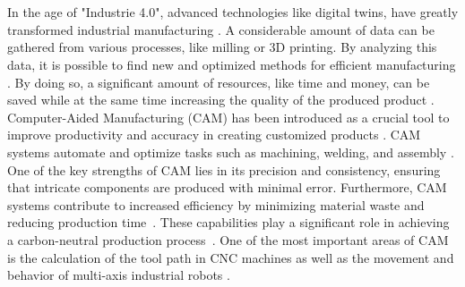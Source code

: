 \documentclass[ZLstudentexpose%
              ,optBiber%
              ,optEnglish%
              ,10pt
              ]{ZLlatex}%
\begin{document}
%
\renewcommand{\ZLlangChair}{\ZLlangGerEng{Name des Lehrstuhls (deutsch)}{Institute for Machine Tools and Industrial Management}}%
%
%

%
\section{}%


In the age of "Industrie 4.0", advanced technologies like digital twins, have greatly transformed industrial manufacturing \cite{Singh.2021}. A considerable amount of data can be gathered from various processes, like milling or 3D printing. By analyzing this data, it is possible to find new and optimized methods for efficient manufacturing \cite{Ghobakhloo.2020}. By doing so, a significant amount of resources, like time and money, can be saved while at the same time increasing the quality of the produced product \cite{Bibby.2018,Simonis.2016}.\newline
Computer-Aided Manufacturing (CAM) has been introduced as a crucial tool to improve productivity and accuracy in creating customized products \cite{Feldhausen.2022}. CAM systems automate and optimize tasks such as machining, welding, and assembly \cite{LalitNarayan.2013b}. One of the key strengths of CAM lies in its precision and consistency, ensuring that intricate components are produced with minimal error. Furthermore, CAM systems contribute to increased efficiency by minimizing material waste and reducing production time~\cite{Dubovska.2014}. These capabilities play a significant role in achieving a carbon-neutral production process~\cite{Saxena.2020}. One of the most important areas of CAM is the calculation of the tool path in CNC machines as well as the movement and behavior of multi-axis industrial robots \cite{Pan}. \newline
\end{document}
